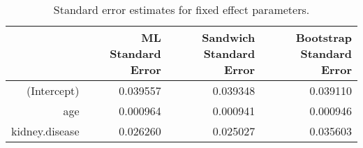 \begin{table}[ht]
\centering
\begin{tabular}{rrrr}
  \toprule
 & ML Standard Error & Sandwich Standard Error & Bootstrap Standard Error \\ 
  \midrule
(Intercept) & 0.039557 & 0.039348 & 0.039110 \\ 
  age & 0.000964 & 0.000941 & 0.000946 \\ 
  kidney.disease & 0.026260 & 0.025027 & 0.035603 \\ 
   \bottomrule
\end{tabular}
\caption{Standard error estimates for fixed effect parameters.} 
\label{tab:standard_errors_no_interaction}
\end{table}

